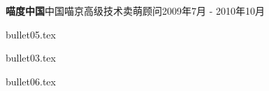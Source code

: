 \begin{rProject}{\bf 喵度中国}{中国喵京}{高级技术卖萌顾问}{2009年7月 - 2010年10月 }
    \item {bullet05.tex}
    \item {bullet03.tex}
    \item {bullet06.tex}
\end{rProject}

